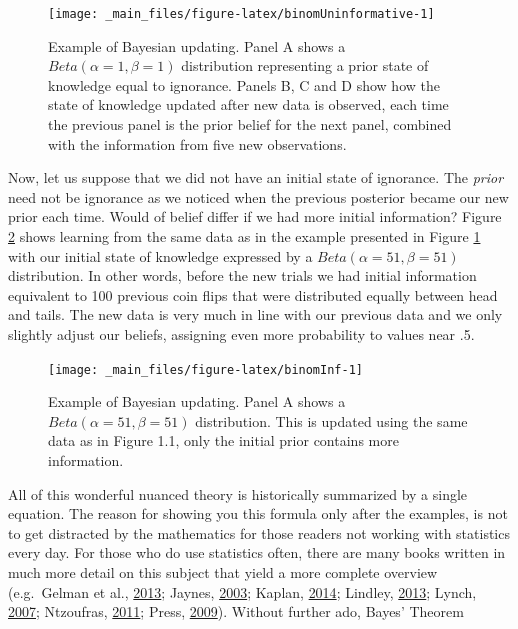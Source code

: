 \documentclass[openright,titlepage,12pt,a4paper]{book}
\begin{document}
\begin{figure}

{\centering \texttt{[image: \_main\_files/figure-latex/binomUninformative-1]} 

}

\caption{Example of Bayesian updating. Panel A shows a $Beta(\alpha = 1, \beta = 1)$ distribution representing a prior state of knowledge equal to ignorance. Panels B, C and D show how the state of knowledge updated after new data is observed, each time the previous panel is the prior belief for the next panel, combined with the information from five new observations.}\label{fig:binomUninformative}
\end{figure}

Now, let us suppose that we did not have an initial state of ignorance. The \emph{prior} need not be ignorance as we noticed when the previous posterior became our new prior each time. Would of belief differ if we had more initial information? Figure \ref{fig:binomInf} shows learning from the same data as in the example presented in Figure \ref{fig:binomUninformative} with our initial state of knowledge expressed by a \(Beta(\alpha = 51, \beta = 51)\) distribution. In other words, before the new trials we had initial information equivalent to 100 previous coin flips that were distributed equally between head and tails. The new data is very much in line with our previous data and we only slightly adjust our beliefs, assigning even more probability to values near .5.

\begin{figure}

{\centering \texttt{[image: \_main\_files/figure-latex/binomInf-1]} 

}

\caption{Example of Bayesian updating. Panel A shows a $Beta(\alpha = 51, \beta = 51)$ distribution. This is updated using the same data as in Figure 1.1, only the initial prior contains more information.}\label{fig:binomInf}
\end{figure}

All of this wonderful nuanced theory is historically summarized by a single equation. The reason for showing you this formula only after the examples, is not to get distracted by the mathematics for those readers not working with statistics every day. For those who do use statistics often, there are many books written in much more detail on this subject that yield a more complete overview (e.g.~Gelman et al., \protect\hyperlink{ref-gelman_bayesian_2013}{2013}; Jaynes, \protect\hyperlink{ref-jaynes_probability_2003}{2003}; Kaplan, \protect\hyperlink{ref-kaplan_bayesian_2014}{2014}; Lindley, \protect\hyperlink{ref-lindley_understanding_2013}{2013}; Lynch, \protect\hyperlink{ref-lynch_introduction_2007}{2007}; Ntzoufras, \protect\hyperlink{ref-ntzoufras_bayesian_2011}{2011}; Press, \protect\hyperlink{ref-press_subjective_2009}{2009}). Without further ado, Bayes' Theorem
\end{document}

